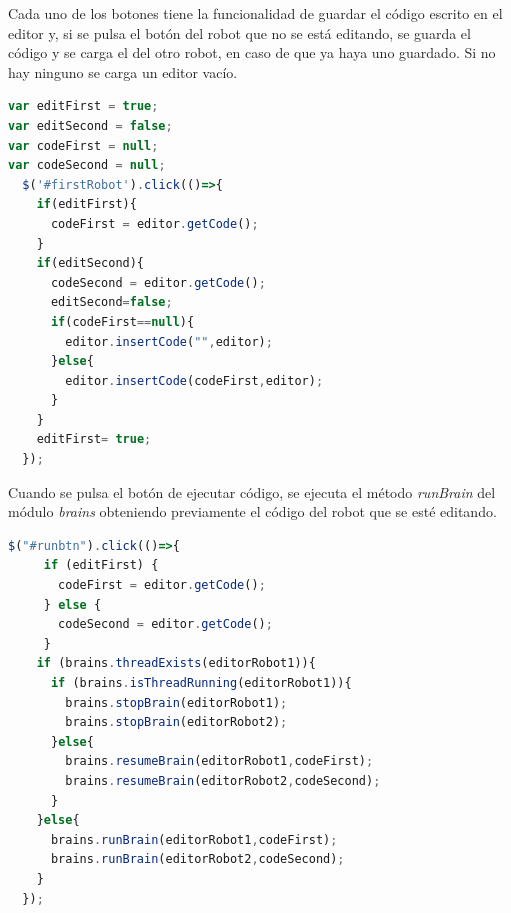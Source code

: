 Cada uno de los botones tiene la funcionalidad de guardar el código escrito en el editor y, si se pulsa el botón del robot que no se está editando, se guarda el código y se carga el  del otro robot, en caso de que ya haya uno guardado. Si no hay ninguno se carga un editor vacío. 

\begin{lstlisting}[language=javascript]
var editFirst = true;
var editSecond = false;
var codeFirst = null;
var codeSecond = null;
  $('#firstRobot').click(()=>{
    if(editFirst){
      codeFirst = editor.getCode();
    }
    if(editSecond){
      codeSecond = editor.getCode();
      editSecond=false;
      if(codeFirst==null){
        editor.insertCode("",editor);
      }else{
        editor.insertCode(codeFirst,editor);
      }
    }
    editFirst= true;
  });
\end{lstlisting}

Cuando se pulsa el botón de ejecutar código, se ejecuta el método \textit{runBrain} del módulo \textit{brains} obteniendo previamente el código del robot que se esté editando.
\begin{lstlisting}[language=javascript]
  $("#runbtn").click(()=>{
     if (editFirst) {
       codeFirst = editor.getCode();
     } else {
       codeSecond = editor.getCode();
     }
    if (brains.threadExists(editorRobot1)){
      if (brains.isThreadRunning(editorRobot1)){
        brains.stopBrain(editorRobot1);
        brains.stopBrain(editorRobot2);
      }else{
        brains.resumeBrain(editorRobot1,codeFirst);
        brains.resumeBrain(editorRobot2,codeSecond);
      }
    }else{
      brains.runBrain(editorRobot1,codeFirst);
      brains.runBrain(editorRobot2,codeSecond);
    }
  });
\end{lstlisting}


